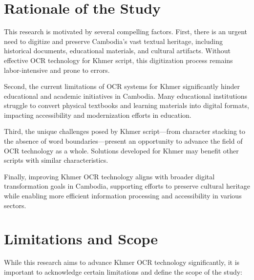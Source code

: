 \section{Rationale of the Study}
\label{sec:rationale}
       This research is motivated by several compelling factors. First, there is an urgent need to digitize and preserve Cambodia's vast textual heritage, including historical documents, educational materials, and cultural artifacts. Without effective OCR technology for Khmer script, this digitization process remains labor-intensive and prone to errors.

Second, the current limitations of OCR systems for Khmer significantly hinder educational and academic initiatives in Cambodia. Many educational institutions struggle to convert physical textbooks and learning materials into digital formats, impacting accessibility and modernization efforts in education.

Third, the unique challenges posed by Khmer script—from character stacking to the absence of word boundaries—present an opportunity to advance the field of OCR technology as a whole. Solutions developed for Khmer may benefit other scripts with similar characteristics.

Finally, improving Khmer OCR technology aligns with broader digital transformation goals in Cambodia, supporting efforts to preserve cultural heritage while enabling more efficient information processing and accessibility in various sectors.

\section{Limitations and Scope}
\label{sec:limitations}

While this research aims to advance Khmer OCR technology significantly, it is important to acknowledge certain limitations and define the scope of the study:

